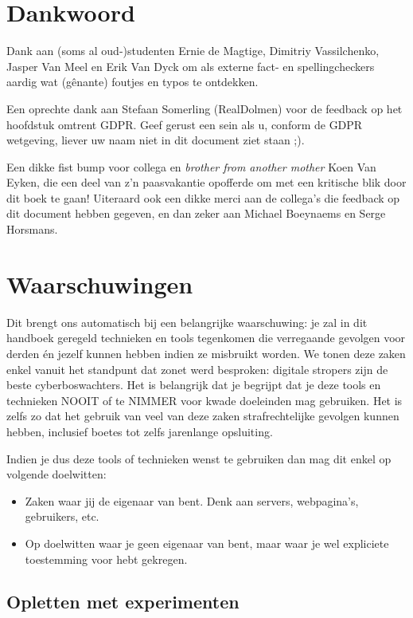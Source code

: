 \documentclass[
  10pt,
  dutch,
  paper=a4,
  ,captions=tableheading
]{scrbook}
\providecommand{\tightlist}{%
  \setlength{\itemsep}{0pt}\setlength{\parskip}{0pt}}
\begin{document}
\section{Dankwoord}\label{dankwoord}

Dank aan (soms al oud-)studenten Ernie de Magtige, Dimitriy
Vassilchenko, Jasper Van Meel en Erik Van Dyck om als externe fact- en
spellingcheckers aardig wat (gênante) foutjes en typos te ontdekken.

Een oprechte dank aan Stefaan Somerling (RealDolmen) voor de feedback op
het hoofdstuk omtrent GDPR. Geef gerust een sein als u, conform de GDPR
wetgeving, liever uw naam niet in dit document ziet staan ;).

Een dikke fist bump voor collega en \emph{brother from another mother}
Koen Van Eyken, die een deel van z'n paasvakantie opofferde om met een
kritische blik door dit boek te gaan! Uiteraard ook een dikke merci aan
de collega's die feedback op dit document hebben gegeven, en dan zeker
aan Michael Boeynaems en Serge Horsmans.

\section{Waarschuwingen}\label{waarschuwingen}

Dit brengt ons automatisch bij een belangrijke waarschuwing: je zal in
dit handboek geregeld technieken en tools tegenkomen die verregaande
gevolgen voor derden én jezelf kunnen hebben indien ze misbruikt worden.
We tonen deze zaken enkel vanuit het standpunt dat zonet werd besproken:
digitale stropers zijn de beste cyberboswachters. Het is belangrijk dat
je begrijpt dat je deze tools en technieken NOOIT of te NIMMER voor
kwade doeleinden mag gebruiken. Het is zelfs zo dat het gebruik van veel
van deze zaken strafrechtelijke gevolgen kunnen hebben, inclusief boetes
tot zelfs jarenlange opsluiting.

Indien je dus deze tools of technieken wenst te gebruiken dan mag dit
enkel op volgende doelwitten:

\begin{itemize}
\tightlist
\item
  Zaken waar jij de eigenaar van bent. Denk aan servers, webpagina's,
  gebruikers, etc.
\item
  Op doelwitten waar je geen eigenaar van bent, maar waar je wel
  expliciete toestemming voor hebt gekregen.
\end{itemize}

\subsection{Opletten met experimenten}\label{opletten-met-experimenten}
\end{document}
